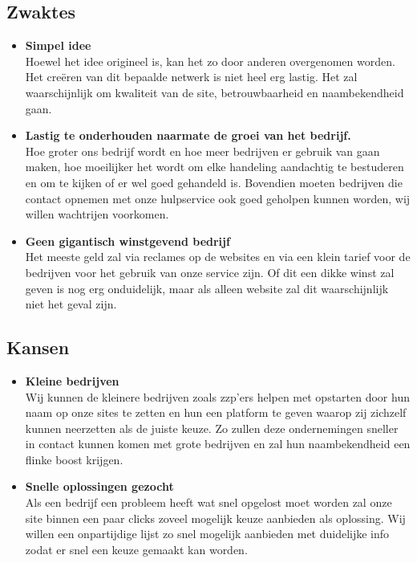 \subsection{Zwaktes}
\begin{itemize}
\item {\bf Simpel idee} \\
  Hoewel het idee origineel is, kan het zo door anderen overgenomen worden. Het creëren van dit bepaalde netwerk is niet heel erg lastig. Het zal waarschijnlijk om kwaliteit van de site, betrouwbaarheid en naambekendheid gaan.
\item {\bf Lastig te onderhouden naarmate de groei van het bedrijf.} \\
  Hoe groter ons bedrijf wordt en hoe meer bedrijven er gebruik van gaan maken, hoe moeilijker het  wordt om elke handeling aandachtig te bestuderen en om te kijken of er wel goed gehandeld is. Bovendien moeten bedrijven die contact opnemen met onze hulpservice ook goed geholpen kunnen worden, wij willen wachtrijen voorkomen.
\item {\bf Geen gigantisch winstgevend bedrijf} \\
  Het meeste geld zal via reclames op de websites en via een klein tarief voor de bedrijven voor het gebruik van onze service zijn. Of dit een dikke winst zal geven is nog erg onduidelijk, maar als alleen website zal dit waarschijnlijk niet het geval zijn.
\end{itemize}
\subsection{Kansen}
\begin{itemize}
\item {\bf Kleine bedrijven} \\
  Wij kunnen de kleinere bedrijven zoals zzp’ers helpen met opstarten door hun naam op onze sites te zetten en hun een platform te geven waarop zij zichzelf kunnen neerzetten als de juiste keuze. Zo zullen deze ondernemingen sneller in contact kunnen komen met grote bedrijven en zal hun naambekendheid een flinke boost krijgen.
\item {\bf Snelle oplossingen gezocht} \\
  Als een bedrijf een probleem heeft wat snel opgelost moet worden zal onze site binnen een paar clicks zoveel mogelijk keuze aanbieden als oplossing. Wij willen een onpartijdige lijst zo snel mogelijk aanbieden met duidelijke info zodat er snel een keuze gemaakt kan worden.
\end{itemize}

